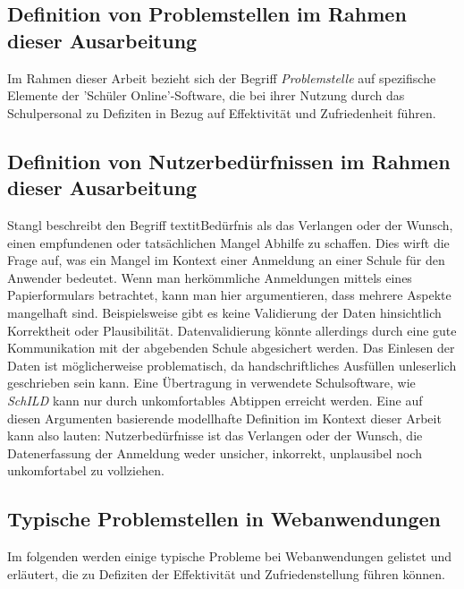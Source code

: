 \subsection{Definition von Problemstellen im Rahmen dieser Ausarbeitung }
Im Rahmen dieser Arbeit bezieht sich der Begriff \textit{Problemstelle} auf spezifische Elemente der 'Schüler Online'-Software, die bei ihrer Nutzung durch das Schulpersonal zu Defiziten in Bezug auf Effektivität und Zufriedenheit führen.

\subsection{Definition von Nutzerbedürfnissen im Rahmen dieser Ausarbeitung }
\cite{stangl} 
Stangl beschreibt den Begriff textit{Bedürfnis} als \glqq das Verlangen oder der Wunsch, einen empfundenen oder tatsächlichen Mangel Abhilfe zu schaffen.\glqq \cite{stangl} Dies wirft die Frage auf, was ein Mangel im Kontext einer Anmeldung an einer Schule für den Anwender bedeutet. Wenn man herkömmliche Anmeldungen mittels eines Papierformulars betrachtet, kann man hier argumentieren, dass mehrere Aspekte mangelhaft sind. Beispielsweise gibt es keine Validierung der Daten hinsichtlich Korrektheit oder Plausibilität.  Datenvalidierung könnte allerdings durch eine gute Kommunikation mit der abgebenden Schule abgesichert werden. Das Einlesen der Daten ist möglicherweise problematisch, da handschriftliches Ausfüllen unleserlich geschrieben sein kann. Eine Übertragung in verwendete Schulsoftware, wie \textit{SchILD} kann nur durch unkomfortables Abtippen erreicht werden.
Eine auf diesen Argumenten basierende modellhafte Definition im Kontext dieser Arbeit kann also lauten: \glqq Nutzerbedürfnisse ist das Verlangen oder der Wunsch, die Datenerfassung der Anmeldung weder unsicher, inkorrekt, unplausibel noch unkomfortabel zu vollziehen\grqq{}.

\subsection{Typische Problemstellen in Webanwendungen}
Im folgenden werden einige typische Probleme bei Webanwendungen gelistet und erläutert, die zu Defiziten der Effektivität und Zufriedenstellung führen können.

